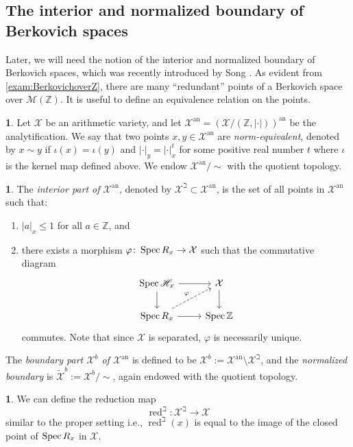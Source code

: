 \documentclass[11pt,reqno]{amsart}
\newcommand{\mZ}{\mathbb{Z}}
\newcommand{\cX}{\mathcal{X}}
\newcommand{\wt}[1]{\widetilde{#1}}
\newcommand{\sH}{{\mathscr H}}
\newcommand{\sM}{{\mathscr M}}
\theoremstyle{theorem}
\numberwithin{equation}{subsection}
\numberwithin{equation}{subsection}
\theoremstyle{definition}
\newtheorem{definition}[subsubsection]{\text{Definition}}
\newtheorem{notation}[subsubsection]{\text{Notation}}
\theoremstyle{remark}
\numberwithin{equation}{subsubsection} \numberwithin{figure}{section}
\DeclareMathOperator{\an}{an}
\DeclareMathOperator{\red}{red}
\newcommand{\cdef}[1]{\textsf{\textit{#1}}}
\renewcommand{\leq}{\leqslant}
\begin{document}
\subsection{The interior and normalized boundary of Berkovich spaces}
\label{subsec:interior_normalizedboundar}
Later, we will need the notion of the interior and normalized boundary of Berkovich spaces, which was recently introduced by Song \cite{Song:EquivariantAdelic}. 
As evident from \autoref{exam:BerkovichoverZ}, there are many ``redundant'' points of a Berkovich space over $\sM(\mZ)$.  
It is useful to define an equivalence relation on the points. 

\begin{definition}\label{defn:normequivalent}
Let $\cX$ be an arithmetic variety, and let $\cX^{\an} = (\cX/(\mZ,|\cdot|))^{\an}$ be the analytification. 
We say that two points $x,y \in \cX^{\an}$ are \cdef{norm-equivalent}, denoted by $x \sim y$ if $\iota(x) = \iota(y)$ and $|\cdot|_y = |\cdot|_x^t$ for some positive real number $t$ where $\iota$ is the kernel map defined above. We endow $\cX^{\an}/\sim$ with the quotient topology. 
\end{definition}



\begin{definition}\label{defn:interiorboundary}
The \cdef{interior part of $\cX^{\an}$}, denoted by $\cX^{\beth} \subset \cX^{\an}$, is the set of all points in $\cX^{\an}$ such that:
\begin{enumerate}
\item $|a|_x\leq 1$ for all $a\in \mZ$, and 
\item there exists a morphism $\varphi\colon \Spec R_x \to \cX$ such that the commutative diagram
\[
\begin{tikzcd}
\Spec \sH_x \arrow{r} \arrow{d} & \cX \arrow{d} \\
\Spec R_x \arrow{r} \arrow[dashed]{ru}{\varphi} & \Spec \mZ
\end{tikzcd}
\]
commutes. Note that since $\cX$ is separated, $\varphi$ is necessarily unique. 
\end{enumerate} 
The \cdef{boundary part $\cX^b$ of $\cX^{\an}$} is defined to be $\cX^{b} := \cX^{\an} \setminus \cX^{\beth}$, and the \cdef{normalized boundary} is $\wt{\cX}^b := \cX^b/\sim$, again endowed with the quotient topology. 
\end{definition}

\begin{notation}
We can define the reduction map 
\[
\red^{\beth}\colon \cX^{\beth} \to \cX
\]
similar to the proper setting i.e., $\red^{\beth}(x)$ is equal to the image of the closed point of $\operatorname{Spec} R_x$ in $\cX$. 
\end{notation}
\end{document}
